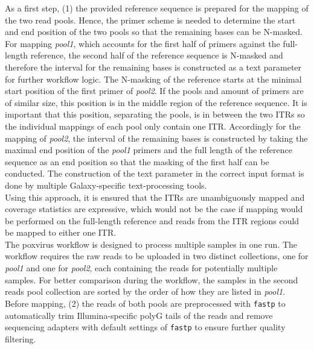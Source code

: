 As a first step, (1) the provided reference sequence is prepared for the mapping of the two read pools. Hence, the primer scheme is needed to determine the start and end position of the two pools so that the remaining bases can be N-masked. For mapping \textit{pool1}, which accounts for the first half of primers against the full-length reference, the second half of the reference sequence is N-masked and therefore the interval for the remaining bases is constructed as a text parameter for further workflow logic. The N-masking of the reference starts at the minimal start position of the first primer of \textit{pool2}. If the pools and amount of primers are of similar size, this position is in the middle region of the reference sequence. It is important that this position, separating the pools, is in between the two \acp{ITR} so the individual mappings of each pool only contain one \ac{ITR}. Accordingly for the mapping of \textit{pool2}, the interval of the remaining bases is constructed by taking the maximal end position of the \textit{pool1} primers and the full length of the reference sequence as an end position so that the masking of the first half can be conducted. The construction of the text parameter in the correct input format is done by multiple Galaxy-specific text-processing tools.\\
Using this approach, it is ensured that the \acp{ITR} are unambiguously mapped and coverage statistics are expressive, which would not be the case if mapping would be performed on the full-length reference and reads from the \ac{ITR} regions could be mapped to either one \ac{ITR}. \\
The poxvirus workflow is designed to process multiple samples in one run. The workflow requires the raw reads to be uploaded in two distinct collections, one for \textit{pool1} and one for \textit{pool2}, each containing the reads for potentially multiple samples. For better comparison during the workflow, the samples in the second reads pool collection are sorted by the order of how they are listed in \textit{pool1}.\\
Before mapping, (2) the reads of both pools are preprocessed with \texttt{fastp} to automatically trim Illumina-specific polyG tails of the reads and remove sequencing adapters with default settings of \texttt{fastp} to ensure further quality filtering. 
